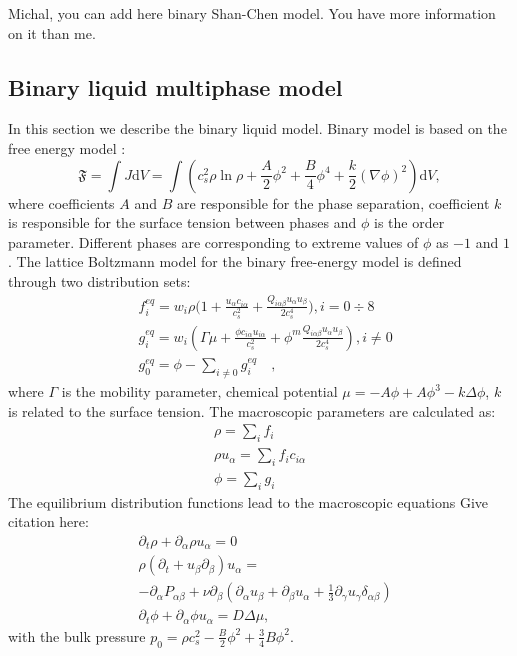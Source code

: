 \documentclass[mathpazo]{cicp}
\begin{document}
{\color{red} Michal, you can add here binary Shan-Chen model. You have more information on it than me.}

\subsection{Binary liquid multiphase model}
In this section we describe the binary liquid model. Binary model is based on
the free energy model \cite{swift,landau}:
\begin{equation}
\mathfrak{F}=\int{J \mathrm{d}V}=\int{\left(c_s^2\rho\ln\rho+\frac{A}{2}\phi^2+\frac{B}{4}\phi^4 + \frac{k}{2}(\nabla \phi)^2 \right)\mathrm{d}V},
\end{equation}
where coefficients $A$ and $B$ are responsible for the phase separation,
coefficient $k$ is responsible for the surface tension between phases and
$\phi$ is the order parameter. Different phases are corresponding to
extreme values of $\phi$ as $-1$ and $1$.
The lattice Boltzmann model for the binary free-energy model is defined
through two distribution sets:
\begin{equation}
\begin{aligned}
&f_i^{eq}=w_i \rho \biggl(1+\frac{u_{\alpha}c_{i\alpha}}{c_s^2}+\frac{Q_{i\alpha\beta}u_{\alpha}u_{\beta}}{2 c_s^4}\biggr), i=0\div8\\
&g_i^{eq}=w_i(\Gamma \mu + \frac{\phi c_{i\alpha} u_{i\alpha}}{c_s^2}+\phi^m \frac{Q_{i\alpha\beta}u_{\alpha}u_{\beta}}{2 c_s^4}), i\neq0 \\
&g_0^{eq}=\phi-\sum_{i\neq0}{g_i^{eq}}\quad,
\end{aligned}
\end{equation}
where $\Gamma$ is the mobility parameter, chemical potential
$\mu=-A\phi+A\phi^3-k\Delta\phi$, $k$ is related to the surface
tension. The macroscopic parameters are calculated as:
\begin{equation}
\begin{aligned}
\rho=\sum_i{f_i}\\
\rho u_{\alpha}=\sum_i{f_i c_{i\alpha}}\\
\phi=\sum_i{g_i}
\end{aligned}
\end{equation}
The equilibrium distribution functions lead to the macroscopic equations
{\color{red} Give citation here}:
\begin{equation}
\begin{aligned}
&\partial_t \rho+ \partial_{\alpha} \rho u_{\alpha}=0\\
&\rho\left(\partial_t+u_{\beta}\partial_{\beta}\right) u_{\alpha}=\\
&-\partial_{\alpha}P_{\alpha \beta} + \nu\partial_{\beta}\left(\partial_{\alpha}u_{\beta}+\partial_{\beta} u_{\alpha} + \frac{1}{3}\partial_{\gamma} u_{\gamma} \delta_{\alpha\beta}\right)\\
&\partial_t \phi + \partial_{\alpha} \phi u_{\alpha}=D\Delta \mu,
\end{aligned}
\label{binary:fluid:system}
\end{equation}
with the bulk pressure $p_0=\rho c_s^2-\frac{B}{2}\phi^2+\frac{3}{4}B \phi^2$.
\end{document}
